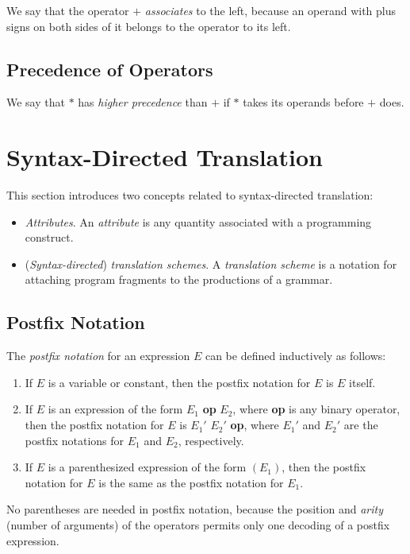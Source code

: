 \documentclass[a4paper,twoside]{book}
\begin{document}
We say that the operator $+$ \textit{associates} to the left, because an operand with plus signs on both sides of it belongs to the operator to its left.

\subsection{Precedence of Operators}

We say that $*$ has \textit{higher precedence} than $+$ if $*$ takes its operands before $+$ does.

\section{Syntax-Directed Translation}

This section introduces two concepts related to syntax-directed translation:
\begin{itemize}
    \item\textit{Attributes}. An \textit{attribute} is any quantity associated with a programming construct.
    \item(\textit{Syntax-directed}) \textit{translation schemes}. A \textit{translation scheme} is a notation for attaching program fragments to the productions of a grammar.
\end{itemize}

\subsection{Postfix Notation}

The \textit{postfix notation} for an expression $E$ can be defined inductively as follows:
\begin{enumerate}
    \item If $E$ is a variable or constant, then the postfix notation for $E$ is $E$ itself.
    \item If $E$ is an expression of the form $E_1$ \textbf{op} $E_2$, where \textbf{op} is any binary operator, then the postfix notation for $E$ is $E_1'$ $E_2'$ \textbf{op}, where $E_1'$ and $E_2'$ are the postfix notations for $E_1$ and $E_2$, respectively.
    \item If $E$ is a parenthesized expression of the form $(E_1)$, then the postfix notation for $E$ is the same as the postfix notation for $E_1$.
\end{enumerate}

No parentheses are needed in postfix notation, because the position and \textit{arity} (number of arguments) of the operators permits only one decoding of a postfix expression.
\end{document}
